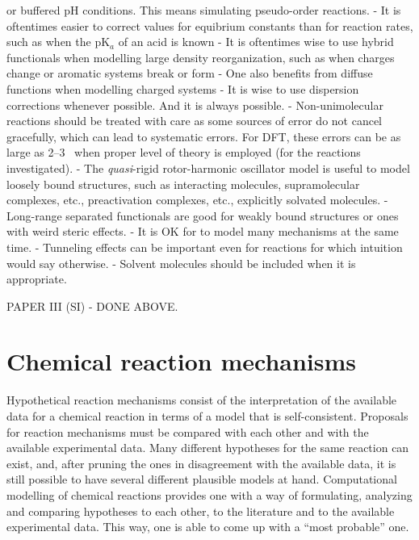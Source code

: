 or buffered pH conditions.
This means simulating pseudo-order reactions.
- It is oftentimes easier to correct values for equibrium constants than for reaction rates,
such as when the pK$_a$ of an acid is known
- It is oftentimes wise to use hybrid functionals when
modelling large density reorganization,
such as when charges change or
aromatic systems break or form
- One also benefits from diffuse functions when modelling charged systems
- It is wise to use dispersion corrections whenever possible.
And it is always possible.
- Non-unimolecular reactions should be treated with care
as some sources of error do not cancel gracefully,
which can lead to systematic errors.
For DFT,
these errors can be as large as 2--3~\kcalmol
when proper level of theory is employed (for the reactions investigated).
- The \emph{quasi}-rigid rotor-harmonic oscillator model
is useful to model loosely bound structures,
such as
interacting molecules,
supramolecular complexes,
etc.,
preactivation complexes,
etc.,
explicitly solvated molecules.
- Long-range separated functionals are good for weakly bound structures
or ones with weird steric effects.
- It is OK for \overreact{} to model many mechanisms at the same time.
- Tunneling effects can be important even for reactions for
which intuition would say otherwise.
- Solvent molecules should be included when it is appropriate.

PAPER III (SI)
- DONE ABOVE.\@



\section{Chemical reaction mechanisms}

Hypothetical reaction mechanisms consist of
the interpretation of the available data for a chemical reaction
in terms of a model that is self-consistent.
Proposals for reaction mechanisms must be compared
with each other
and with the available experimental data.
Many different hypotheses for the same reaction can exist,
and,
after pruning the ones in disagreement with the available data,
it is still possible to have several different plausible models at hand.
Computational modelling of chemical reactions
provides one with a way of
formulating,
analyzing and
comparing hypotheses to each other,
to the literature and to the available experimental data.
This way,
one is able to come up with a ``most probable'' one.

